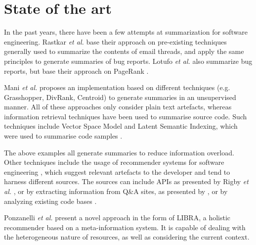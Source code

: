 \section{State of the art}\label{sec:stateOfTheArt}
In the past years, there have been a few attempts at summarization for software engineering. Rastkar \textit{et al.} \cite{A4} base their approach on pre-existing techniques generally used to summarize the contents of email threads, and apply the same principles to generate summaries of bug reports. Lotufo \textit{et al.} \cite{A5} also summarize bug reports, but base their approach on PageRank \cite{ilprints422}. 

Mani \textit{et al.} \cite{A7} proposes an implementation based on different techniques (e.g. Grasshopper, DivRank, Centroid) to generate summaries in an unsupervised manner. All of these approaches only consider plain text artefacts, whereas information retrieval techniques have been used to summarise source code. Such techniques include Vector Space Model and Latent Semantic Indexing, which were used to summarise code samples \cite{A8} \cite{A9}. 

The above examples all generate summaries to reduce information overload. Other techniques include the usage of recommender systems for software engineering \cite{B3}, which suggest relevant artefacts to the developer and tend to harness different sources. The sources can include APIs as presented by Rigby \textit{et al.} \cite{B4} \cite{B5}, or by extracting information from Q\&A sites, as presented by \cite{B6}, or by analyzing existing code bases \cite{B7} \cite{B8} \cite{B9} \cite{B10}. 

Ponzanelli \textit{et al.} \cite{Ponz2017a} present a novel approach in the form of LIBRA, a holistic recommender based on a meta-information system. It is capable of dealing with the heterogeneous nature of resources, as well as considering the current context.
